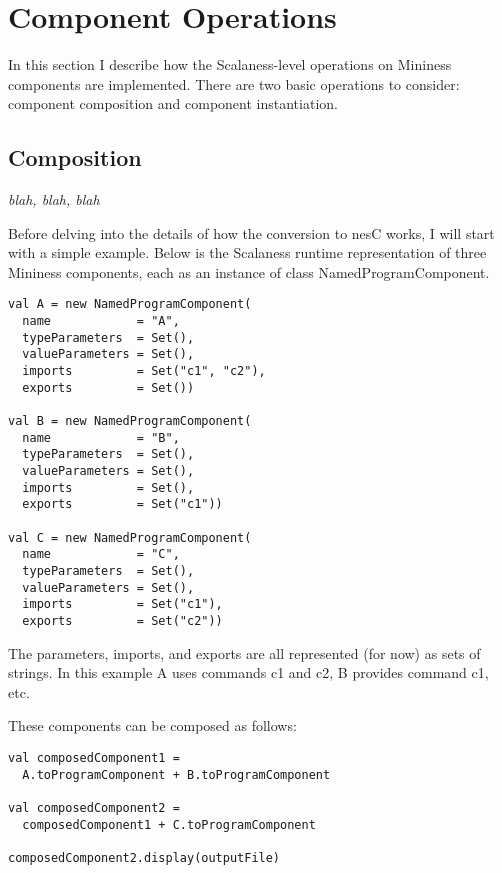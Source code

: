 \section{Component Operations}

In this section I describe how the Scalaness-level operations on Mininess components are
implemented. There are two basic operations to consider: component composition and component
instantiation.

\subsection{Composition}

\textit{blah, blah, blah}

Before delving into the details of how the conversion to nesC works, I will start with a simple
example. Below is the Scalaness runtime representation of three Mininess components, each as an
instance of class NamedProgramComponent.

\singlespace
\begin{lstlisting}[language=scalaness]
val A = new NamedProgramComponent(
  name            = "A",
  typeParameters  = Set(),
  valueParameters = Set(),
  imports         = Set("c1", "c2"),
  exports         = Set())

val B = new NamedProgramComponent(
  name            = "B",
  typeParameters  = Set(),
  valueParameters = Set(),
  imports         = Set(),
  exports         = Set("c1"))

val C = new NamedProgramComponent(
  name            = "C",
  typeParameters  = Set(),
  valueParameters = Set(),
  imports         = Set("c1"),
  exports         = Set("c2"))
\end{lstlisting}
\primaryspacing

The parameters, imports, and exports are all represented (for now) as sets of strings. In this
example A uses commands c1 and c2, B provides command c1, etc.

These components can be composed as follows:

\singlespace
\begin{lstlisting}[language=scalaness]
val composedComponent1 =
  A.toProgramComponent + B.toProgramComponent

val composedComponent2 =
  composedComponent1 + C.toProgramComponent

composedComponent2.display(outputFile)
\end{lstlisting}
\primaryspacing

